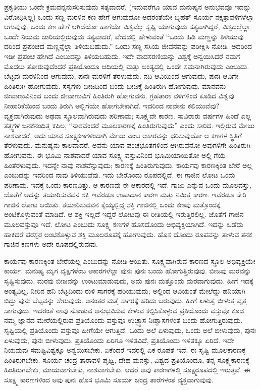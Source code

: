 ಪ್ರಕೃತಿಯು ಒಂದೇ ಕ್ರಮವನ್ನನುಸರಿಸುವುದು ಸತ್ಯವಾದರೆ, (ಇದುವರೆಗೂ ಯಾವ ಮನುಷ್ಯನ ಅನುಭವವೂ ಇದನ್ನು ವಿರೋಧಿಸಿಲ್ಲ) ಒಂದು ಸಣ್ಣ ಮರಳಿನ ಕಣ ಹೇಗೆ ಆಗುವುದೋ ಅದರಂತೆಯೇ ಬೃಹತ್​ ಸೂರ್ಯ ನಕ್ಷತ್ರಾವಳಿಗಳೆಲ್ಲಾ ಆಗುವುವು. ಒಂದು ಕಣ ಹೇಗೆ ಆಗಿದೆಯೋ ಹಾಗೆಯೇ ವಿಶ್ವವೆಲ್ಲ ಸೃಷ್ಟಿ ಯಾಗುವುದು ಸತ್ಯವಾಗಿದ್ದರೆ, ವಿಶ್ವದಲ್ಲೆಲ್ಲಾ ಒಂದೇ ನಿಯಮ ಜಾರಿಯಲ್ಲಿರುವುದು ಸತ್ಯವಾದರೆ, ವೇದದಲ್ಲಿ ಹೇಳುವಂತೆ “ಒಂದು ಹಿಡಿ ಮಣ್ಣನ್ನು ತಿಳಿಯುವು ದರಿಂದ ಪ್ರಪಂಚದ ಮಣ್ಣನ್ನೆಲ್ಲಾ ತಿಳಿಯಬಹುದು.” ಒಂದು ಸಣ್ಣ ಸಸಿಯ ಜೀವನವನ್ನು ಪರೀಕ್ಷಿಸಿ ನೋಡಿ. ಅದರಿಂದ ಇಡೀ ಪ್ರಪಂಚ ಹೇಗಿದೆ ಎಂಬುದನ್ನು ತಿಳಿಯಬಹುದು. ಇದೇ ವಾದಸರಣಿಯನ್ನು ವಿಶ್ವಕ್ಕೆ ಅನ್ವಯಿಸಿದರೆ ನಮಗೆ ಮೊದಲು ತೋರುವುದೆಂದರೆ ಪ್ರತಿಯೊಂದೂ ಆದಿಯಲ್ಲಿ ಮತ್ತು ಅಂತ್ಯದಲ್ಲಿ ಒಂದೇ ಸಮನಾಗಿರುವುದು ಎಂಬುದು. ಬೆಟ್ಟವು ಮರಳಿನಿಂದ ಆಗುವುದು, ಪುನಃ ಮರಳಿಗೆ ತೆರಳುವುದು. ನದಿ ಆವಿಯಿಂದ ಆಗುವುದು, ಪುನಃ ಆವಿಗೇ ಹಿಂತಿರುಗಿ ಹೋಗುವುದು. ಸಸ್ಯಗಳು ಬೀಜದಿಂದ ಬಂದು ಬೀಜಕ್ಕೆ ಹಿಂತಿರುಗಿ ಹೋಗುವುವು. ಮಾನವನು ಜೀವಾಣುವಿನಿಂದ ಬಂದು ಜೀವಾಣುವಿಗೆ ಹಿಂತಿರುಗಿ ಹೋಗುವನು. ಗ್ರಹತಾರಾ ವಳಿಗಳಿಂದ ಕೂಡಿದ ವಿಶ್ವವು ನೀಹಾರಿಕೆಯಿಂದ ಬಂದು ತಿರುಗಿ ಅಲ್ಲಿಗೆಯೇ ಹೋಗಬೇಕಾಗಿದೆ. ಇದರಿಂದ ನಾವೇನು ಕಲಿಯುವೆವು? ವ್ಯಕ್ತವಾಗಿರುವುದು ಅಥವಾ ಸ್ಥೂಲವಾಗಿರುವುದು ಪರಿಣಾಮ; ಸೂಕ್ಷ್ಮವೇ ಕಾರಣ. ಸಾವಿರಾರು ವರ್ಷಗಳ ಹಿಂದೆ ಎಲ್ಲ ತತ್ತ್ವಗಳ ಜನಕನಂದಿತ್ತ ಕಪಿಲ, “ನಾಶವೆಂದರೆ ಮೂಲಕಾರಣಕ್ಕೆ ಹಿಂತಿರುಗುವುದು” ಎಂದು ಸಾರಿದ. ಇಲ್ಲಿರುವ ಮೇಜು ನಾಶವಾದರೆ, ಅದು ಯಾವ ಸೂಕ್ಷ್ಮಕಣಗಳಿಂದಾಗಿ ಮೇಜು ಎಂಬ ಆಕಾರವನ್ನು ಧರಿಸುವುದೋ ಆ ಕಣಗಳ ಸ್ಥಿತಿಗೆ ತೆರಳುವುದು. ಮನುಷ್ಯನು ಕಾಲವಾದರೆ, ಅವನು ಯಾವ ಪಂಚಭೂತಗಳಿಂದ ಆಗಿರುವನೋ ಅವುಗಳಿಗೇ ಹಿಂತಿರುಗಿ ಹೋಗುವನು. ಈ ಭೂಮಿ ನಾಶವಾದರೆ ಯಾವ ಸೂಕ್ಷ್ಮ ವಸ್ತುವಿನಿಂದ ಭೂಮಿಯಾಯಿತೋ ಅಲ್ಲಿ ಗೆಯೆ ಹಿಂತೆರಳುವುದು. ಇದನ್ನೇ ನಾವು ನಾಶವೆನ್ನುವುದು; ಕಾರಣಕ್ಕೆ ಹಿಂತಿರುಗುವುದು. ಕಾರ್ಯವು ಕಾರಣಕ್ಕಿಂತ ಬೇರೆ ಅಲ್ಲ ಎಂಬುದನ್ನು ಇದರಿಂದ ನಾವು ತಿಳಿಯುವೆವು. ಇದು ಬೇರೊಂದು ರೂಪದಲ್ಲಿದೆ. ಈ ಗಾಜಿನ ಲೋಟ ಒಂದು ಪರಿಣಾಮ. ಇದಕ್ಕೆ ಒಂದು ಕಾರಣವಿತ್ತು. ಆ ಕಾರಣವು ಈ ಆಕಾರದಲ್ಲಿ ಇದೆ. ಗಾಜು ಎನ್ನುವ ಒಂದು ಮೂಲವಸ್ತು, ಜೊತೆಗೆ ಅದನ್ನು ತಯಾರಿಸುವವನ ಶಕ್ತಿ ಇವೆರಡೂ ಉಪಾದಾನ ಕಾರಣ ಮತ್ತು ನಿಮಿತ್ತ ಕಾರಣ. ಇವೆರಡೂ ಸೇರಿ ಗಾಜಿನ ಲೋಟ ಆಯಿತು. ತಯಾರಿಸುವವನ ಕೈಯ್ಯಲ್ಲಿದ್ದ ಶಕ್ತಿ ಗಾಜಿನಲ್ಲಿ ಒಂದು ಕಣವು ಮತ್ತೊಂದಕ್ಕೆ ಅಂಟಿಕೊಳ್ಳುವಂತೆ ಮಾಡಿದೆ. ಆ ಶಕ್ತಿ ಇಲ್ಲದೆ ಇದ್ದರೆ ಲೋಟವು ಈ ರೀತಿಯಲ್ಲಿ ಇರುತ್ತಿರಲಿಲ್ಲ. ಜೊತೆಗೆ ಗಾಜಿನ ಮೂಲವಸ್ತುವೂ ಇದೆ. ಲೋಟ ಎಂಬುದು ಸೂಕ್ಷ್ಮ ಕಣಗಳ ಹೊಸದೊಂದು ಅಭಿವ್ಯಕ್ತಿಯಾಗಿದೆ. ಇದನ್ನು ಒಡೆದು ಹಾಕಿದರೆ ಪರಸ್ಪರ ಅಂಟಿಕೊಳ್ಳುವ ಶಕ್ತಿ ಮೂಲರೂಪಕ್ಕೆ ಹೋಗುವುದು. ಹೊಸ ದೊಂದು ರೂಪವನ್ನು ತಾಳುವ ತನಕ ಗಾಜಿನ ಕಣಗಳು ಅದೇ ರೂಪದಲ್ಲಿರುವುವು.

ಕಾರ್ಯವು ಕಾರಣಕ್ಕಿಂತ ಬೇರೆಯಲ್ಲ ಎಂಬುದನ್ನು ನೋಡಿ ಆಯಿತು. ಸೂಕ್ಷ್ಮವಾಗಿರುವ ಕಾರಣದ ಸ್ಥೂಲ ಅಭಿವ್ಯಕ್ತಿಯೇ ಕಾರ್ಯ. ಮನುಷ್ಯ ಮೃಗ ವೃಕ್ಷಗಳೆಂಬ ಆಕಾರಗಳೆಲ್ಲಾ ಪುನಃ ಪುನಃ ಬಂದು ಹೋಗುತ್ತಿರುವುವು. ಬೀಜವು ಮರವನ್ನು ಸೃಷ್ಟಿಸುವುದು, ಮರವು ಬೀಜವನ್ನು ಉಂಟುಮಾಡುವುದು, ಅದು ಪುನಃ ಮತ್ತೊಂದು ಮರವಾಗುವುದು. ಹೀಗೆ ಇದಕ್ಕೆ ಅಂತ್ಯವಿಲ್ಲ. ನೀರಿನ ಹನಿ ಬೆಟ್ಟದಿಂದು ರುಳಿ ಸಾಗರಕ್ಕೆ ಹರಿಯುವುದು; ಅಲ್ಲಿಂದ ಆವಿಯಂತೆ ಮೇಲೆದ್ದು ಹನಿಯಾಗಿ ಬಿದ್ದು ಪುನಃ ಬೆಟ್ಟವನ್ನು ಸೇರುವುದು. ಅನಂತರ ಮತ್ತೆ ಸಾಗರಕ್ಕೆ ಹರಿದು ಬರುವುದು. ಹೀಗೆ ಏಳುತ್ವ ಬೀಳುತ್ತ ವೃತ್ತ ಸಾಗುವುದು. ಇದರಂತೆ ನಾವು ನೋಡುವ ಅನುಭವಿಸುವ ಕೇಳುವ ಕಲ್ಪಿಸಿಕೊಳ್ಳುವ ಪ್ರತಿಯೊಂದು ವಸ್ತುವೂ ಕೂಡ. ನಮ್ಮ ಜ್ಞಾನದ ಮೇರೆಯಲ್ಲಿರುವ ಪ್ರತಿಯೊಂದು ವಸ್ತುವೂ ಉಚ್ಛ್ವಾಸ ನಿಃಶ್ವಾಸಗಳಂತೆ ಬಂದು ಹೋಗುತ್ತಿರುವುದು. ಸೃಷ್ಟಿಯಲ್ಲಿ ಪ್ರತಿಯೊಂದು ವಸ್ತುವೂ ಹೀಗೆಯೇ ಆಗುತ್ತಿದೆ. ಒಂದು ಅಲೆ ಏಳುವುದು, ಒಂದು ಅಲೆ ಬೀಳುವುದು, ಪುನಃ ಏಳುವುದು, ಪುನಃ ಬೀಳುವುದು. ಪ್ರತಿಯೊಂದು ಏರಿಗೂ ಇಳಿತವಿದೆ, ಪ್ರತಿಯೊಂದು ಇಳಿತಕ್ಕೂ ಏರಿದೆ. ಇದೇ ನಿಯಮವು ಸಮಷ್ಟಿವಿಶ್ವಕ್ಕೂ ಅನ್ವಯಿಸಬೇಕು. ಏಕೆಂದರೆ ಇದರಲ್ಲಿ ಏಕ ರೂಪತೆ ಇದೆ. ಈ ಸೃಷ್ಟಿ ಮೂಲಕಾರಣಕ್ಕೆ ಹಿಂತಿರುಗಬೇಕು. ಸೂರ್ಯ ಚಂದ್ರ ತಾರಾವಳಿ ಪೃಥ್ವಿ, ದೇಹ ಮನಸ್ಸು, ವಿಶ್ವದ ಪ್ರತಿಯೊಂದೂ, ತನ್ನ ಸೂಕ್ಷ್ಮಕಾರಣಕ್ಕೆ ಹಿಂತಿರುಗಬೇಕು, ಮಾಯವಾಗಬೇಕು, ನಾಶವಾಗಬೇಕು. ಆದರೆ ಅವು ಕಾರಣಗಳಲ್ಲಿ ಸೂಕ್ಷ್ಮರೂಪದಲ್ಲಿ ಇರುತ್ತವೆ. ಈ ಸೂಕ್ಷ್ಮ ಕಾರಣಗಳಿಂದ ಅವು ಪುನಃ ಹೊಸ ಭೂಮಿ ಸೂರ್ಯ ಚಂದ್ರ ತಾರೆಗಳಂತೆ ವ್ಯಕ್ತವಾಗುವುವು.

